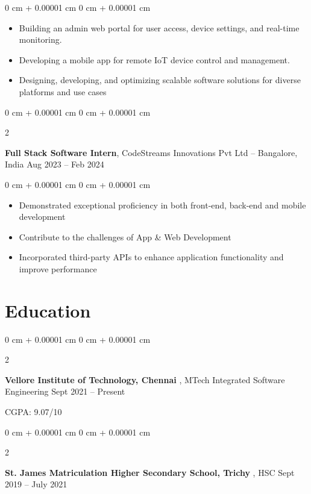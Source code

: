 \documentclass[10pt, letterpaper]{article}
\newenvironment{highlights}{
    \begin{itemize}[
        topsep=0.10 cm,
        parsep=0.10 cm,
        partopsep=0pt,
        itemsep=0pt,
        leftmargin=0 cm + 10pt
    ]
}{
    \end{itemize}
} %
\newenvironment{onecolentry}{
    \begin{adjustwidth}{
        0 cm + 0.00001 cm
    }{
        0 cm + 0.00001 cm
    }
}{
    \end{adjustwidth}
} %
\newenvironment{twocolentry}[2][]{
    \onecolentry
    \def\secondColumn{#2}
    \setcolumnwidth{\fill, 4.5 cm}
    \begin{paracol}{2}
}{
    \switchcolumn \raggedleft \secondColumn
    \end{paracol}
    \endonecolentry
} %
\begin{document}
        \vspace{0.10 cm}
        \begin{onecolentry}
            \begin{highlights}
                \item Building an admin web portal for user access, device settings, and real-time monitoring.  
                \item Developing a mobile app for remote IoT device control and management. 
                \item  Designing, developing, and optimizing scalable software solutions for diverse platforms and use cases 
            \end{highlights}
        \end{onecolentry}

        \vspace{0.3 cm}
        
        \begin{twocolentry}{
            Aug 2023 – Feb 2024
        }
            \textbf{Full Stack Software Intern}, CodeStreams Innovations Pvt Ltd – Bangalore, India  \end{twocolentry}

        \vspace{0.10 cm}
        \begin{onecolentry}
            \begin{highlights}
                \item Demonstrated exceptional proficiency in both front-end, back-end and mobile development 
                \item Contribute to the challenges of App \& Web Development 
                \item Incorporated third-party APIs to enhance application functionality and improve performance 
            \end{highlights}
        \end{onecolentry}
  \section{Education}
        
        \begin{twocolentry}{
            Sept 2021 – Present
        }
            \textbf{Vellore Institute of Technology, Chennai }, MTech Integrated Software Engineering \end{twocolentry}

        \vspace{0.10 cm}
       CGPA: 9.07/10
\vspace{0.10 cm}
\begin{twocolentry}{
            Sept 2019 – July 2021
        }
            \textbf{St. James Matriculation Higher Secondary School, Trichy  }, HSC\end{twocolentry}
\end{document}

